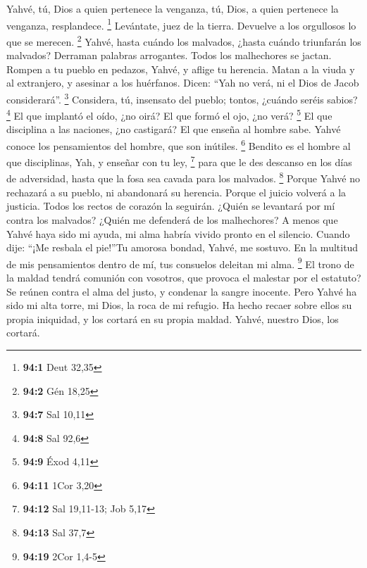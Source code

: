 \begin{paracol}{2}
 Yahvé, tú, Dios a quien pertenece la venganza, tú, Dios,
a quien pertenece la venganza, resplandece. \footnote{\textbf{94:1} Deut
  32,35}  Levántate, juez de la tierra. Devuelve a los
orgullosos lo que se merecen. \footnote{\textbf{94:2} Gén 18,25}
 Yahvé, hasta cuándo los malvados, ¿hasta cuándo
triunfarán los malvados?  Derraman palabras arrogantes.
Todos los malhechores se jactan.  Rompen a tu pueblo en
pedazos, Yahvé, y aflige tu herencia.  Matan a la viuda y
al extranjero, y asesinar a los huérfanos.  Dicen: ``Yah
no verá, ni el Dios de Jacob considerará''. \footnote{\textbf{94:7} Sal
  10,11}  Considera, tú, insensato del pueblo; tontos,
¿cuándo seréis sabios? \footnote{\textbf{94:8} Sal 92,6} 
El que implantó el oído, ¿no oirá? El que formó el ojo, ¿no verá?
\footnote{\textbf{94:9} Éxod 4,11}  El que disciplina a
las naciones, ¿no castigará? El que enseña al hombre sabe.
 Yahvé conoce los pensamientos del hombre, que son
inútiles. \footnote{\textbf{94:11} 1Cor 3,20}  Bendito es
el hombre al que disciplinas, Yah, y enseñar con tu ley, \footnote{\textbf{94:12}
  Sal 19,11-13; Job 5,17}  para que le des descanso en
los días de adversidad, hasta que la fosa sea cavada para los malvados.
\footnote{\textbf{94:13} Sal 37,7}  Porque Yahvé no
rechazará a su pueblo, ni abandonará su herencia.  Porque
el juicio volverá a la justicia. Todos los rectos de corazón la
seguirán.  ¿Quién se levantará por mí contra los
malvados? ¿Quién me defenderá de los malhechores?  A
menos que Yahvé haya sido mi ayuda, mi alma habría vivido pronto en el
silencio.  Cuando dije: ``¡Me resbala el pie!''Tu amorosa
bondad, Yahvé, me sostuvo.  En la multitud de mis
pensamientos dentro de mí, tus consuelos deleitan mi alma. \footnote{\textbf{94:19}
  2Cor 1,4-5}  El trono de la maldad tendrá comunión con
vosotros, que provoca el malestar por el estatuto?  Se
reúnen contra el alma del justo, y condenar la sangre inocente.
 Pero Yahvé ha sido mi alta torre, mi Dios, la roca de mi
refugio.  Ha hecho recaer sobre ellos su propia
iniquidad, y los cortará en su propia maldad. Yahvé, nuestro Dios, los
cortará.

\switchcolumn
\begin{otherlanguage}{english}


\end{otherlanguage}
\end{paracol}
